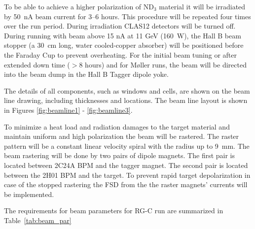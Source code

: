 \documentclass[12pt]{article}
\begin{document}
To be able to achieve a higher polarization of ND$_3$ material it will be irradiated by 50~nA beam current for 3--6 hours. This procedure will be repeated four times over the run period. During irradiation CLAS12 detectors will be turned off. During running with beam above 15 nA at 11 GeV (160~W), the Hall B beam stopper (a 30~cm long, water cooled-copper absorber) will be positioned before the Faraday Cup to prevent overheating. 
For the initial beam tuning or after extended down time ($>$8 hours) and for M\o{}ller runs, the beam will be directed into the beam dump in the Hall B Tagger dipole yoke.



The details of all components, such as windows and cells, are shown on the beam line drawing, including thicknesses and locations.  The beam line layout is shown in Figures \ref{fig:beamline1} - \ref{fig:beamline3}.


To minimize a heat load and radiation damages to the target material and maintain uniform and high polarization the beam will be rastered. The raster pattern will be a constant linear velocity  spiral with the radius up to 9~mm. The beam rastering will be done by two pairs of dipole magnets. The first pair is located between 2C24A BPM and the tagger magnet. The second pair is located between the 2H01 BPM and the target. To prevent rapid target depolarization in case of the stopped rastering the FSD from the the raster magnets' currents will be implemented.

The requirements for beam parameters for RG-C run are summarized in Table~\ref{tab:beam_par}
\end{document}

